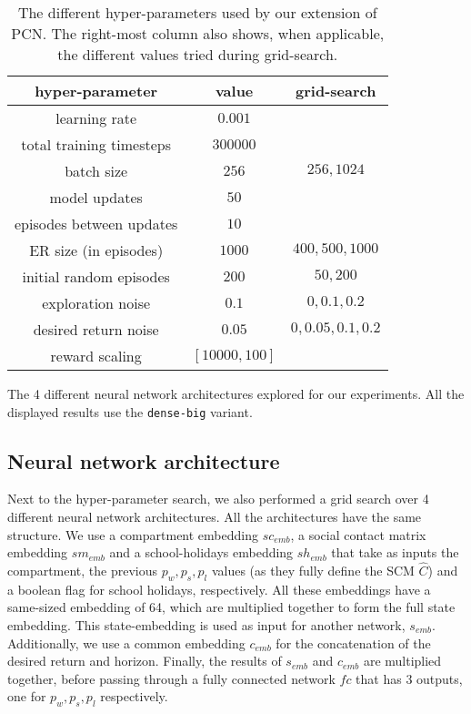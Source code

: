 \documentclass{article}
\begin{document}
\begin{table}[t]
    \centering
    \begin{tabular}{|c|c|c|}
        \hline
        hyper-parameter & value & grid-search \\
        \hline
        learning rate & $0.001$ &  \\
        total training timesteps & $300000$  & \\
        batch size & $256$ & $256, 1024$ \\
        model updates & $50$ & \\
        episodes between updates & $10$ & \\
        ER size (in episodes) & $1000$ & $400, 500, 1000$ \\
        initial random episodes & $200$ & $50, 200$ \\
        exploration noise & $0.1$ & $0, 0.1, 0.2$ \\
        desired return noise & $0.05$ & $0, 0.05, 0.1, 0.2$ \\
        reward scaling & $[10000, 100]$ & \\
        \hline
    \end{tabular}
    \caption{The different hyper-parameters used by our extension of PCN. The right-most column also shows, when applicable, the different values tried during grid-search.}
    \label{tab:pcn-hyperparameters}
\end{table}

\begin{table}[h]
    \centering
    
    \caption{The 4 different neural network architectures explored for our experiments. All the displayed results use the \texttt{dense-big} variant.}
    \label{tab:nn-architecture}
\end{table}

\subsection{Neural network architecture}
\label{sec:pcn-architecture}

Next to the hyper-parameter search, we also performed a grid search over 4 different neural network architectures. All the architectures have the same structure. We use a compartment embedding $sc_{emb}$, a social contact matrix embedding $sm_{emb}$ and a school-holidays embedding $sh_{emb}$ that take as inputs the compartment, the previous $p_w, p_s, p_l$ values (as they fully define the SCM $\hat{C}$) and a boolean flag for school holidays, respectively. All these embeddings have a same-sized embedding of 64, which are multiplied together to form the full state embedding. This state-embedding is used as input for another network, $s_{emb}$. Additionally, we use a common embedding $c_{emb}$ for the concatenation of the desired return and horizon. Finally, the results of $s_{emb}$ and $c_{emb}$ are multiplied together, before passing through a fully connected network $fc$ that has 3 outputs, one for $p_w, p_s, p_l$ respectively.
\end{document}
